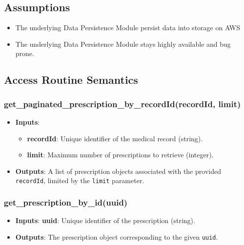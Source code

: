 \documentclass[12pt, titlepage]{article}
\begin{document}
\subsection{Assumptions}
\begin{itemize}
    \item The underlying Data Persistence Module persist data into storage on AWS
    \item The underlying Data Persistence Module stays highly available and bug prone.
\end{itemize}


\subsection{Access Routine Semantics}
\subsubsection{get\_paginated\_prescription\_by\_recordId(recordId, limit)}
\begin{itemize}
    \item \textbf{Inputs}:
        \begin{itemize}
            \item \textbf{recordId}: Unique identifier of the medical record (string).
            \item \textbf{limit}: Maximum number of prescriptions to retrieve (integer).
        \end{itemize}
    \item \textbf{Outputs}: A list of prescription objects associated with the provided \texttt{recordId}, limited by the \texttt{limit} parameter.
\end{itemize}

\subsubsection{get\_prescription\_by\_id(uuid)}
\begin{itemize}
    \item \textbf{Inputs}: \textbf{uuid}: Unique identifier of the prescription (string).
    \item \textbf{Outputs}: The prescription object corresponding to the given \texttt{uuid}.
\end{itemize}
\end{document}
